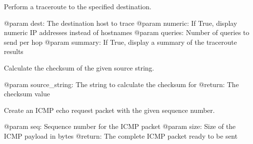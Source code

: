 \documentclass[letterpaper,10pt,english]{sphinxmanual}
\begin{document}
\begin{fulllineitems}
\label{\detokenize{modules:my_traceroute.traceroute}}
\pysigstartsignatures
\pysiglinewithargsret
{}
{\sphinxparamcomma {}\sphinxparamcomma {}\sphinxparamcomma {}}
{}
\pysigstopsignatures
\sphinxAtStartPar
Perform a traceroute to the specified destination.

\sphinxAtStartPar
@param dest: The destination host to trace
@param numeric: If True, display numeric IP addresses instead of hostnames
@param queries: Number of queries to send per hop
@param summary: If True, display a summary of the traceroute results

\end{fulllineitems}

\label{\detokenize{modules:module-helpers}}

\begin{fulllineitems}
\label{\detokenize{modules:helpers.calculate_checksum}}
\pysigstartsignatures
\pysiglinewithargsret
{}
{}
{}
\pysigstopsignatures
\sphinxAtStartPar
Calculate the checksum of the given source string.

\sphinxAtStartPar
@param source\_string: The string to calculate the checksum for
@return: The checksum value

\end{fulllineitems}


\begin{fulllineitems}
\label{\detokenize{modules:helpers.create_packet}}
\pysigstartsignatures
\pysiglinewithargsret
{}
{\sphinxparamcomma {}}
{}
\pysigstopsignatures
\sphinxAtStartPar
Create an ICMP echo request packet with the given sequence number.

\sphinxAtStartPar
@param seq: Sequence number for the ICMP packet
@param size: Size of the ICMP payload in bytes
@return: The complete ICMP packet ready to be sent

\end{fulllineitems}
\end{document}
